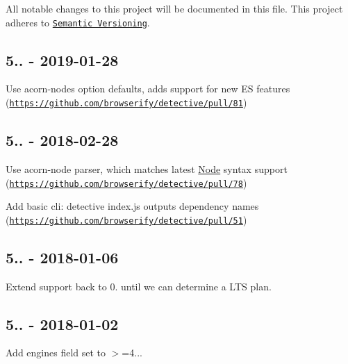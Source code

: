 All notable changes to this project will be documented in this file. This project adheres to \href{http://semver.org/}{\tt Semantic Versioning}.

\subsection*{5.. -\/ 2019-\/01-\/28}


\begin{DoxyItemize}
\item Use acorn-\/node\textquotesingle{}s option defaults, adds support for new ES features (\href{https://github.com/browserify/detective/pull/81}{\tt https\+://github.\+com/browserify/detective/pull/81})
\end{DoxyItemize}

\subsection*{5.. -\/ 2018-\/02-\/28}


\begin{DoxyItemize}
\item Use acorn-\/node parser, which matches latest \mbox{\hyperlink{classNode}{Node}} syntax support (\href{https://github.com/browserify/detective/pull/78}{\tt https\+://github.\+com/browserify/detective/pull/78})
\item Add basic cli\+: {\ttfamily detective index.\+js} outputs dependency names (\href{https://github.com/browserify/detective/pull/51}{\tt https\+://github.\+com/browserify/detective/pull/51})
\end{DoxyItemize}

\subsection*{5.. -\/ 2018-\/01-\/06}


\begin{DoxyItemize}
\item Extend support back to 0. until we can determine a L\+TS plan.
\end{DoxyItemize}

\subsection*{5.. -\/ 2018-\/01-\/02}


\begin{DoxyItemize}
\item Add engines field set to {\ttfamily $>$=4..}.
\end{DoxyItemize}

